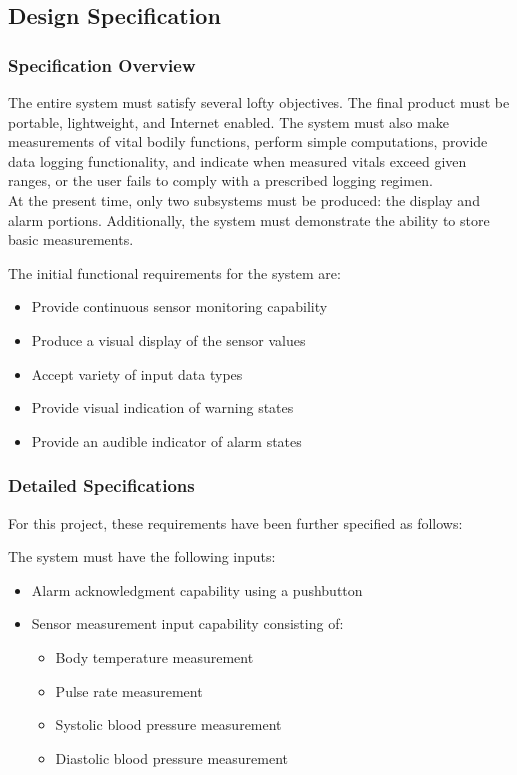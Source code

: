 \documentclass[12pt]{article} %
\begin{document}
\subsection{Design Specification\label{sec:designSpec}}

\subsubsection{Specification Overview}
The entire system must satisfy several lofty objectives. The final product must be portable, lightweight, and Internet enabled. The system must also make measurements of vital bodily functions, perform simple computations, provide data logging functionality, and indicate when measured vitals exceed given ranges, or the user fails to comply with a prescribed logging regimen. \\
At the present time, only two subsystems must be produced: the display and alarm portions. Additionally, the system must demonstrate the ability to store basic measurements. \\

\begin{itemize}[$$]
  \item The initial functional requirements for the system are:
    \begin{itemize}[$\bullet$]
      \item Provide continuous sensor monitoring capability
      \item Produce a visual display of the sensor values
      \item Accept variety of input data types
      \item Provide visual indication of warning states
      \item Provide an audible indicator of alarm states
    \end{itemize}
\end{itemize}

\subsubsection{Detailed Specifications}
For this project, these requirements have been further specified as follows:

\begin{itemize}[$$]
  \item The system must have the following inputs:
    \begin{itemize}[$\bullet$]
      \item Alarm acknowledgment capability using a pushbutton
      \item Sensor measurement input capability consisting of:
	\begin{itemize}
	\item Body temperature measurement
	\item Pulse rate measurement
	\item Systolic blood pressure measurement
	\item Diastolic blood pressure measurement
	\end{itemize}
    \end{itemize}
\end{itemize}
\end{document}
